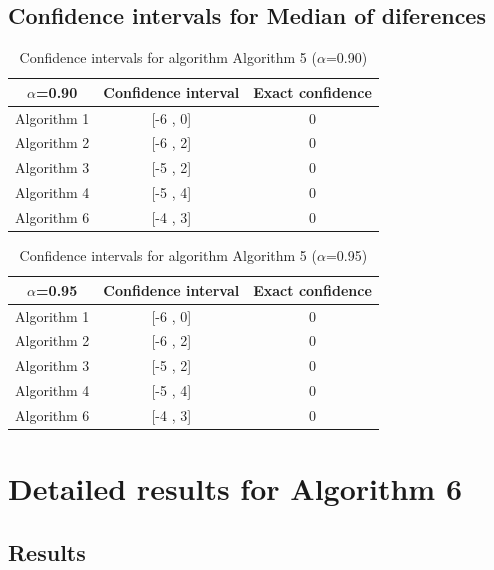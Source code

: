 \documentclass[a4paper,10pt]{article}
\begin{document}
\subsection{Confidence intervals for Median of diferences}

\begin{table}[!htp]
\centering\small
\begin{tabular}{
|c|c|c|}
\hline
 $\alpha$=0.90 & Confidence interval & Exact confidence \\ \hline 
Algorithm 1 & [-6 , 0] & 0\\ \hline 
Algorithm 2 & [-6 , 2] & 0\\ \hline 
Algorithm 3 & [-5 , 2] & 0\\ \hline 
Algorithm 4 & [-5 , 4] & 0\\ \hline 
Algorithm 6 & [-4 , 3] & 0\\ \hline 

\end{tabular}
\caption{Confidence intervals for algorithm Algorithm 5 ($\alpha$=0.90)}
\end{table}
\begin{table}[!htp]
\centering\small
\begin{tabular}{
|c|c|c|}
\hline
 $\alpha$=0.95 & Confidence interval & Exact confidence \\ \hline 
Algorithm 1 & [-6 , 0] & 0\\ \hline 
Algorithm 2 & [-6 , 2] & 0\\ \hline 
Algorithm 3 & [-5 , 2] & 0\\ \hline 
Algorithm 4 & [-5 , 4] & 0\\ \hline 
Algorithm 6 & [-4 , 3] & 0\\ \hline 

\end{tabular}
\caption{Confidence intervals for algorithm Algorithm 5 ($\alpha$=0.95)}
\end{table}

 \clearpage 


\section{Detailed results for Algorithm 6}


\subsection{Results}
\end{document}
